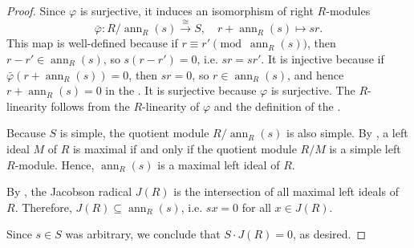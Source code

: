 \begin{proof}
    Since $\varphi$ is surjective, it induces an isomorphism of right $R$-modules
    $$\bar{\varphi}: R / \operatorname{ann}_R(s) \xrightarrow{\cong} S, \quad r + \operatorname{ann}_R(s) \longmapsto sr.$$
    This map is well-defined because if $r \equiv r' \pmod{\operatorname{ann}_R(s)}$, then $r - r' \in \operatorname{ann}_R(s)$, so $s(r - r') = 0$, i.e. $sr = sr'$. It is injective because if $\bar{\varphi}(r + \operatorname{ann}_R(s)) = 0$, then $sr = 0$, so $r \in \operatorname{ann}_R(s)$, and hence $r + \operatorname{ann}_R(s) = 0$ in the . It is surjective because $\varphi$ is surjective. The $R$-linearity follows from the $R$-linearity of $\varphi$ and the definition of the .

    Because $S$ is simple, the quotient module $R / \operatorname{ann}_R(s)$ is also simple. By , a left ideal $M$ of $R$ is maximal if and only if the quotient module $R/M$ is a simple left $R$-module. Hence, $\operatorname{ann}_R(s)$ is a maximal left ideal of $R$.

    By , the Jacobson radical $J(R)$ is the intersection of all maximal left ideals of $R$. Therefore, $J(R) \subseteq \operatorname{ann}_R(s)$, i.e. $sx = 0$ for all $x \in J(R)$.

    Since $s \in S$ was arbitrary, we conclude that $S \cdot J(R) = 0$, as desired.
\end{proof}